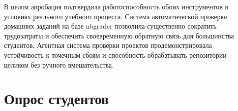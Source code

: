 В целом апробация подтвердила работоспособность обоих инструментов в условиях реального учебного процесса. Система автоматической проверки домашних заданий на базе nbgrader позволила существенно сократить трудозатраты и обеспечить своевременную обратную связь для большинства студентов. Агентная система проверки проектов продемонстрировала устойчивость к точечным сбоям и способность обрабатывать репозитории целиком без ручного вмешательства. 

\section{Опрос студентов}